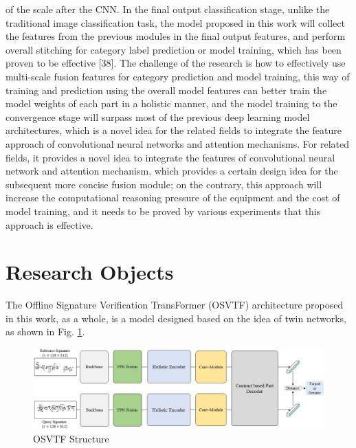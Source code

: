 of the scale after the CNN. In the final output classification stage, unlike the traditional image classification task, the model proposed in this work will collect the features from the previous modules in the final output features, and perform overall stitching for category label prediction or model training, which has been proven to be effective [38]. The challenge of the research is how to effectively use multi-scale fusion features for category prediction and model training, this way of training and prediction using the overall model features can better train the model weights of each part in a holistic manner, and the model training to the convergence stage will surpass most of the previous deep learning model architectures, which is a novel idea for the related fields to integrate the feature approach of convolutional neural networks and attention mechanisms. For related fields, it provides a novel idea to integrate the features of convolutional neural network and attention mechanism, which provides a certain design idea for the subsequent more concise fusion module; on the contrary, this approach will increase the computational reasoning pressure of the equipment and the cost of model training, and it needs to be proved by various experiments that this approach is effective.

\section{Research Objects}

The Offline Signature Verification TransFormer (OSVTF) architecture proposed in this work, as a whole, is a model designed based on the idea of twin networks, as shown in Fig. \ref{fig:overview}.

\begin{figure}[htbp]
    \begin{center}
        \includegraphics[scale=0.46]{figure/overview.jpg}
    \end{center}
    \caption{OSVTF Structure}
    \label{fig:overview}
\end{figure}

